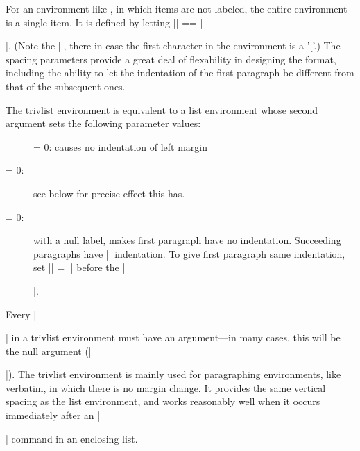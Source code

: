  For an environment like , in which items are not labeled,
 the entire environment is a single item.  It is defined by
 letting |\quotation| == |\item\relax|.  (Note the
 |\relax|, there in case the first character in the environment is a
 '['.)  The spacing parameters provide a great deal of flexability in
 designing the format, including the ability to let the indentation of
 the first paragraph be different from that of the subsequent ones.

 The trivlist environment is equivalent to a list environment
 whose second argument sets the following parameter values:
 \begin{description}
 \item[{}] = 0: causes no indentation of left margin
 \item[ = 0:] see below for precise effect this has.
 \item[ = 0:] with a null label, makes first paragraph
        have no indentation.  Succeeding paragraphs have |\parindent|
        indentation.  To give first paragraph same indentation, set
        |\itemindent| = |\parindent| before the |\item[]|.
 \end{description}

 Every |\item| in a trivlist environment must have an argument---in
 many cases, this will be the null argument (|\item[]|).  The trivlist
 environment is mainly used for paragraphing environments, like
 verbatim, in which there is no margin change.  It provides the same
 vertical spacing as the list environment, and works reasonably well
 when it occurs immediately after an |\item| command in an enclosing
 list.


